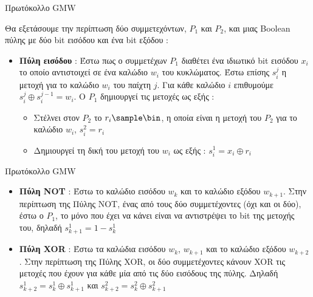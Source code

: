 \documentclass[10pt]{beamer}
\begin{document}
    \begin{frame}{Πρωτόκολλο GMW}
        \begin{block}{}
            Θα εξετάσουμε την περίπτωση δύο συμμετεχόντων, $P_1$ και $P_2$, και μιας Boolean πύλης με δύο bit εισόδου και ένα bit εξόδου :
            \begin{itemize}
                \item \textbf{Πύλη εισόδου} : Έστω πως ο συμμετέχων $P_1$ διαθέτει ένα ιδιωτικό bit εισόδου $x_i$ το οποίο αντιστοιχεί σε ένα καλώδιο $w_i$ του κυκλώματος. Έστω επίσης $s_i^j$ η μετοχή για το καλώδιο $w_i$ του παίχτη $j$. Για κάθε καλώδιο $i$ επιθυμούμε $s_i^j \oplus s_i^{j-1} = w_i$. Ο $P_1$ δημιουργεί τις μετοχές ως εξής :
                \begin{itemize}
                    \item Στέλνει στον $P_2$ το $r_i \sample \bin$, η οποία είναι η μετοχή του $P_2$ για το καλώδιο $w_i$, $s_i^2 = r_i$
                    \item Δημιουργεί τη δική του μετοχή του $w_i$ ως εξής : $s_i^1 = x_i \oplus r_i$
                \end{itemize}
            \end{itemize}
        \end{block}
    \end{frame}

    \begin{frame}{Πρωτόκολλο GMW}
        \begin{block}{}
            \begin{itemize}
            \item \textbf{Πύλη NOT} : Έστω το καλώδιο εισόδου $w_k$ και το καλώδιο εξόδου $w_{k+1}$. Στην περίπτωση της Πύλης NOT, ένας από τους δύο συμμετέχοντες (όχι και οι δύο), έστω ο $P_1$, το μόνο που έχει να κάνει είναι να αντιστρέψει το bit της μετοχής του, δηλαδή $s_{k+1}^1 = 1-s_k^1$
            \item \textbf{Πύλη XOR} : Έστω τα καλώδια εισόδου $w_k$, $w_{k+1}$ και το καλώδιο εξόδου $w_{k+2}$. Στην περίπτωση της Πύλης XOR, οι δύο συμμετέχοντες κάνουν XOR τις μετοχές που έχουν για κάθε μία από τις δύο εισόδους της πύλης. Δηλαδή $s_{k+2}^1 = s_{k}^1 \oplus s_{k+1}^1$ και $s_{k+2}^2 = s_k^2 \oplus s_{k+1}^2$
            \end{itemize}
        \end{block}
    \end{frame}
\end{document}
